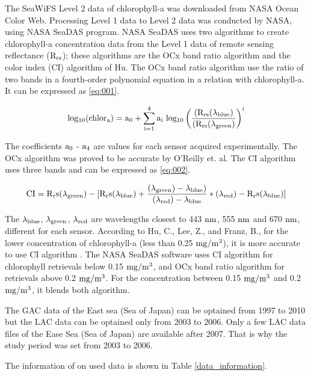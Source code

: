  The SeaWiFS Level 2 data of chlorophyll-a was downloaded from NASA Ocean Color Web. Processing Level 1 data to Level 2 data was conducted by NASA, using NASA SeaDAS program. NASA SeaDAS uses two algorithms to create chlorophyll-a concentration data from the Level 1 data of remote sensing reflectance ($\rm R_{rs}$); these algorithms are the OCx band ratio algorithm and the color index (CI) algorithm of Hu. 
 The OCx band ratio algorithm use the ratio of two bands in a fourth-order polynomial equation in a relation with chlorophyll-a. It can be expressed as \eqref{eq:001}.
 
 \begin{equation}
 {\rm log_{10} (chlor_a) = a_0 + \sum_{i=1}^4 a_i ~ log_{10} \left( \frac{(R_{rs}(\lambda_{blue})}{(R_{rs}(\lambda_{green})} \right) ^i }
 \label{eq:001}
 \end{equation}
 
The coefficients $\rm a_0$ - $\rm a_4$ are values for each sensor acquired experimentally. The OCx algorithm was proved to be accurate by O’Reilly et. al\cite{o2000ocean}. The CI algorithm uses three bands and can be expressed as \eqref{eq:002}.

 \begin{equation}
{\rm CI = R_rs ({\lambda}_{green}) - [R_rs ({\lambda}_{blue}) + \frac {({\lambda}_{green}) - {\lambda}_{blue})} {({\lambda}_{red}) - {\lambda}_{blue}} * ({\lambda}_{red}) - R_rs ({\lambda}_{blue}) ]}
\label{eq:002}
\end{equation}

The $\rm {\lambda}_{blue}$, $\rm {\lambda}_{green}$, $\rm {\lambda}_{red}$ are wavelengths closest to 443 $\rm nm$, 555 $\rm nm$ and 670 $\rm nm$, different for each sensor. According to Hu, C., Lee, Z., and Franz, B., for the lower concentration of chlorophyll-a (less than 0.25 $\rm mg/m^3$), it is more accurate to use CI algorithm \cite{hu2012chlorophyll}. The NASA SeaDAS software uses CI algorithm for chlorophyll retrievals below 0.15 $\rm mg/m^3$, and OCx band ratio algorithm for retrievals above 0.2 $\rm mg/m^3$. For the concentration between 0.15 $\rm mg/m^3$ and 0.2 $\rm mg/m^3$, it blends both algorithm.

The GAC data of the East sea (Sea of Japan) can be optained from 1997 to 2010 but the LAC data can be optained only from 2003 to 2006. Only a few LAC data files of the Ease Sea (Sea of Japan) are available after 2007. That is why the study period was set from 2003 to 2006.

The information of on used data is shown in Table \ref{data_information}.

